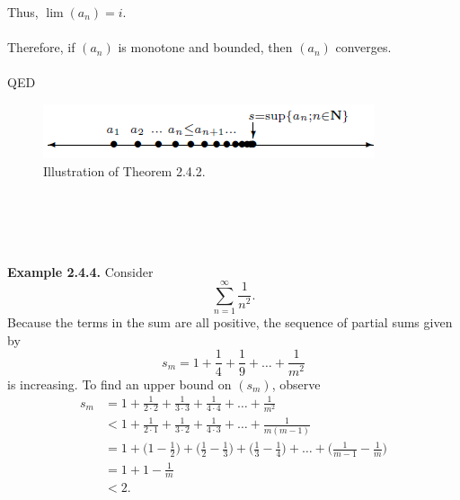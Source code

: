 \documentclass{article}
\begin{document}
                Thus, $\lim(a_n)=i.$\\ \\
                Therefore, if $(a_n)$ is monotone and bounded, then $(a_n)$ converges.\\ \\
                QED
                \begin{figure}[ht!]
                    \centering
                    \includegraphics[width=0.6\linewidth]{figs/theorem 2.4.2.png}
                    \caption{Illustration of Theorem 2.4.2.}
                \end{figure}
                \\ \\
                \\ \\
                \textbf{Example 2.4.4.} Consider
                \begin{equation*}
                    \sum_{n=1}^\infty \frac{1}{n^2}.
                \end{equation*}
                Because the terms in the sum are all positive, the sequence of partial sums given by
                \begin{equation*}
                    s_m = 1 + \frac{1}{4} + \frac{1}{9} + \dots + \frac{1}{m^2}
                \end{equation*}
                is increasing. To find an upper bound on $(s_m)$, observe
                \begin{align*}
                    s_m & = 1 + \frac{1}{2\cdot2} + \frac{1}{3\cdot3} + \frac{1}{4\cdot4} + \dots + \frac{1}{m^2} \\
                    & < 1 + \frac{1}{2\cdot1} + \frac{1}{3\cdot2} + \frac{1}{4\cdot3} + \dots + \frac{1}{m(m-1)} \\
                    & = 1 + \bigg(1-\frac{1}{2}\bigg) + \bigg(\frac{1}{2}-\frac{1}{3}\bigg) + \bigg(\frac{1}{3}-\frac{1}{4}\bigg) + \dots + \bigg(\frac{1}{m-1}-\frac{1}{m}\bigg) \\
                    & = 1+1-\frac{1}{m} \\
                    & < 2.
                \end{align*}
\end{document}
